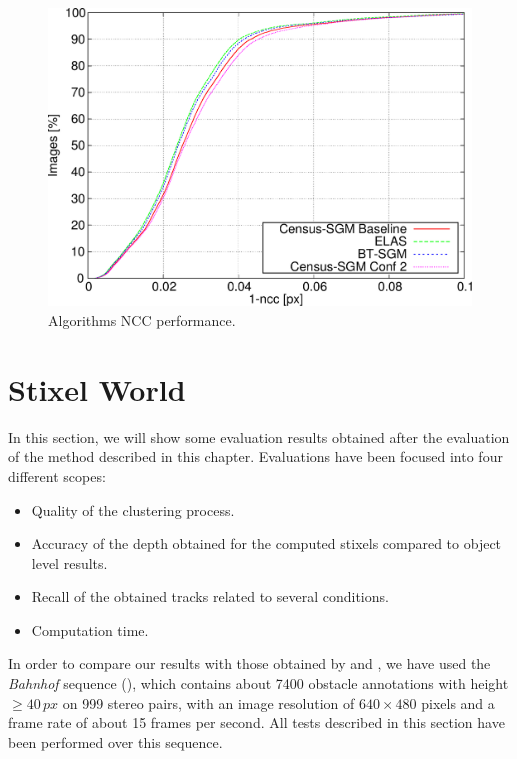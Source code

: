 \begin{figure}[h]
  \centering
  \includegraphics[width=\textwidth, trim=0 0 0 0,clip]{algo_ncc}
  \caption{ Algorithms NCC performance.}
  \label{fig:cp03_algorithms_NCC}
\end{figure}%

\graphicspath{{./images/chapter04/bmps/}{./images/chapter04/vects/}{./images/chapter04/}}
\section{Stixel World}\label{ch:chapter04_02}

In this section, we will show some evaluation results obtained after the evaluation of the method described in this chapter. Evaluations have been focused into four different scopes: 

\begin{itemize}
 \item Quality of the clustering process.
 \item Accuracy of the depth obtained for the computed stixels compared to object level results.
 \item Recall of the obtained tracks related to several conditions.
 \item Computation time.
\end{itemize}

In order to compare our results with those obtained by \cite{gunyel2012stixels} and \cite{benenson2011stixels}, we have used the \emph{Bahnhof} sequence (\cite{ess2009robust}), which contains about 7400 obstacle annotations with height $\geq 40\,px$ on 999 stereo pairs, with an image resolution of $640 \times 480$ pixels and a frame rate of about 15 frames per second. All tests described in this section have been performed over this sequence.

